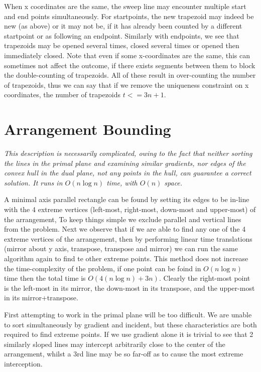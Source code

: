 \documentclass{article}
\begin{document}
When x coordinates are the same, the sweep line may encounter multiple start and end points simultaneously.
For startpoints, the new trapezoid may indeed be new (as above) or it may not be, if it has already been counted by a different startpoint or as following an endpoint.
Similarly with endpoints, we see that trapezoids may be opened several times, closed several times or opened then immediately closed.
Note that even if some x-coordinates are the same, this can sometimes not affect the outcome, if there exists segments between them to block the double-counting of trapezoids.
All of these result in over-counting the number of trapezoids, thus we can say that if we remove the uniqueness constraint on x coordinates, the number of trapezoids $t <= 3n + 1$.

\section {Arrangement Bounding}

{\em This description is necessarily complicated, owing to the fact that neither sorting the lines in the primal plane and examining similar gradients, nor edges of the convex hull in the dual plane, not any points in the hull, can guarantee a correct solution.
It runs in $O(n \log n)$ time, with $O(n)$ space.}

A minimal axis parallel rectangle can be found by setting its edges to be in-line with the 4 extreme vertices (left-most, right-most, down-most and upper-most) of the arrangement,
To keep things simple we exclude parallel and vertical lines from the problem.
Next we observe that if we are able to find any one of the 4 extreme vertices of the arrangement, then by performing linear time translations (mirror about y axis, transpose, transpose and mirror) we can run the same algorithm again to find te other extreme points.
This method does not increase the time-complexity of the problem, if one point can be foind in $O(n \log n)$ time then the total time is $O(4(n \log n) + 3n)$.
Clearly the right-most point is the left-most in its mirror, the down-most in its transpose, and the upper-most in its mirror+transpose.

First attempting to work in the primal plane will be too difficult.
We are unable to sort simultaneously by gradient and incident, but these characteristics are both required to find extreme points.
If we use gradient alone it is trivial to see that 2 similarly sloped lines may intercept arbitrarily close to the center of the arrangement, whilst a 3rd line may be so far-off as to cause the most extreme interception.
\end{document}
